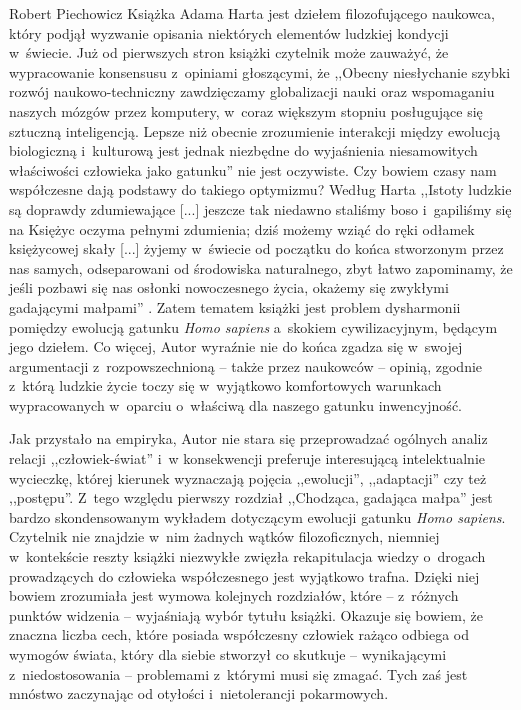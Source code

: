 \begin{newrevplenv}{Robert Piechowicz}
Książka Adama Harta jest dziełem filozofującego naukowca, który podjął wyzwanie opisania niektórych elementów ludzkiej kondycji w~świecie. Już od pierwszych stron książki czytelnik może zauważyć, że wypracowanie konsensusu z~opiniami głoszącymi, że ,,Obecny niesłychanie szybki rozwój naukowo-techniczny zawdzięczamy globalizacji nauki oraz wspomaganiu naszych mózgów przez komputery, w~coraz większym stopniu posługujące się sztuczną inteligencją. Lepsze niż obecnie zrozumienie interakcji między ewolucją biologiczną i~kulturową jest jednak niezbędne do wyjaśnienia \guillemotleft niesamowitych właściwości człowieka jako gatunku\guillemotright'' 
\parencite[][s.~172]{kozlowski_ewolucja_2018} %
 nie jest oczywiste. Czy bowiem czasy nam współczesne dają podstawy do takiego optymizmu? Według Harta ,,Istoty ludzkie są doprawdy zdumiewające [...] jeszcze tak niedawno staliśmy boso i~gapiliśmy się na Księżyc oczyma pełnymi zdumienia; dziś możemy wziąć do ręki odłamek księżycowej skały [...] żyjemy w~świecie od początku do końca stworzonym przez nas samych, odseparowani od środowiska naturalnego, zbyt łatwo zapominamy, że jeśli pozbawi się nas osłonki nowoczesnego życia, okażemy się zwykłymi gadającymi małpami'' 
\parencite[][s.~9]{hart_niedostosowani_2021}. %
 Zatem tematem książki jest problem dysharmonii pomiędzy ewolucją gatunku \textit{Homo sapiens} a~skokiem cywilizacyjnym, będącym jego dziełem. Co więcej, Autor wyraźnie nie do końca zgadza się w~swojej argumentacji z~rozpowszechnioną -- także przez naukowców -- opinią, zgodnie z~którą ludzkie życie toczy się w~wyjątkowo komfortowych warunkach wypracowanych w~oparciu o~właściwą dla naszego gatunku inwencyjność.

Jak przystało na empiryka, Autor nie stara się przeprowadzać ogólnych analiz relacji ,,człowiek-świat'' i~w konsekwencji preferuje interesującą intelektualnie wycieczkę, której kierunek wyznaczają pojęcia ,,ewolucji'', ,,adaptacji'' czy też ,,postępu''. Z~tego względu pierwszy rozdział ,,Chodząca, gadająca małpa'' jest bardzo skondensowanym wykładem dotyczącym ewolucji gatunku \textit{Homo sapiens}. Czytelnik nie znajdzie w~nim żadnych wątków filozoficznych, niemniej w~kontekście reszty książki niezwykłe zwięzła rekapitulacja wiedzy o~drogach prowadzących do człowieka współczesnego jest wyjątkowo trafna. Dzięki niej bowiem zrozumiała jest wymowa kolejnych rozdziałów, które -- z~różnych punktów widzenia -- wyjaśniają wybór tytułu książki. Okazuje się bowiem, że znaczna liczba cech, które posiada współczesny człowiek rażąco odbiega od wymogów świata, który dla siebie stworzył co skutkuje -- wynikającymi z~niedostosowania -- problemami z~którymi musi się zmagać. Tych zaś jest mnóstwo zaczynając od otyłości i~nietolerancji pokarmowych.


\end{newrevplenv}
